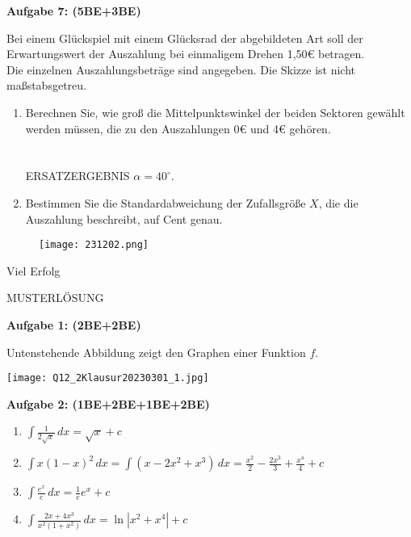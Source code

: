 \documentclass[a4paper,12pt]{article}
\newcommand{\Aufgabe}[1]{
  {
  \vspace*{0.5cm}
  \textsf{\textbf{Aufgabe #1}}
  \vspace*{0.2cm}
  
  }
}
\begin{document}
\Aufgabe{7: (5BE+3BE)}
\begin{minipage}[t]{0.7\textwidth}
  Bei einem Glückspiel mit einem Glücksrad der abgebildeten Art soll der Erwartungswert der Auszahlung bei einmaligem Drehen 1,50\euro{} betragen.\\
  Die einzelnen Auszahlungsbeträge sind angegeben. Die Skizze ist nicht maßstabsgetreu.
  \begin{enumerate}[label={\alph*)}]
    \item Berechnen Sie, wie groß die Mittelpunktswinkel der beiden Sektoren gewählt werden müssen, die zu den Auszahlungen 0\euro{} und 4\euro{} gehören.
\\
\\
\\
ERSATZERGEBNIS $\alpha=40^{\circ}$.
    \item Bestimmen Sie die Standardabweichung der Zufallsgröße $X$, die die Auszahlung beschreibt, auf Cent genau.
  \end{enumerate}
\end{minipage}
\hspace*{0.75cm}
\begin{minipage}[t]{0.3\textwidth}
  \begin{figure}[H]
    \vspace{0cm}
    \centering
    \texttt{[image: 231202.png]}
  \end{figure}
\end{minipage}

\vspace{2cm}
\centerline{Viel Erfolg \faThumbsOUp }

\newpage
{
\Huge{MUSTERLÖSUNG}
}

\small

\Aufgabe{1: (2BE+2BE)}

Untenstehende Abbildung zeigt den Graphen einer Funktion $f$.
\begin{center}
\texttt{[image: Q12\_2Klausur20230301\_1.jpg]}
\end{center}


\Aufgabe{2: (1BE+2BE+1BE+2BE)} 

\begin{enumerate}[label={\alph*)}]
  \item $\int \frac{1}{2\sqrt{x}}\, dx = \sqrt{x} +c$
  \item $\int x(1-x)^2\, dx = \int (x-2x^2+x^3)\, dx=\frac{x^2}{2}-\frac{2x^3}{3}+\frac{x^4}{4} +c $
  \item $\int \frac{e^x}{e}\, dx=\frac{1}{e} e^x +c$
  \item $\int \frac{2x+4x^3}{x^2(1+x^2)}\, dx=\ln |x^2+x^4|+c$
\end{enumerate}
\end{document}
